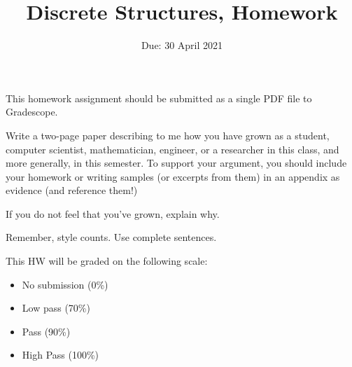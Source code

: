 \documentclass{article}
\title{Discrete Structures, Homework \hwnum}
\author{\todo{Put Your Name Here}}
\date{Due: 30 April 2021}
\begin{document}
\maketitle

This homework assignment should be
submitted as a single PDF file to Gradescope.

Write a two-page paper describing to me how you have grown as a student,
computer scientist, mathematician, engineer, or a researcher in this class, and
more generally, in this semester.  To support your argument, you should include
your homework or writing samples (or excerpts from them) in an appendix as
evidence (and reference them!)

If you do not feel that you've grown, explain why.

Remember, style counts. Use complete sentences.

This HW will be graded on the following scale:
\begin{itemize}
    \item No submission (0\%)
    \item Low pass (70\%)
    \item Pass (90\%)
    \item High Pass (100\%)
\end{itemize}
\end{document}
